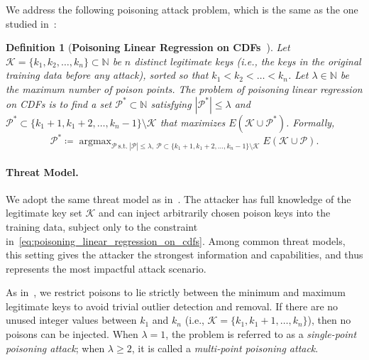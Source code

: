 \documentclass[acmsmall]{acmart}
\newtheorem{definition}{Definition}
\DeclareMathOperator*{\argmax}{argmax}
\begin{document}
We address the following poisoning attack problem, which is the same as the one studied in~\cite{kornaropoulos2022price}:
\begin{definition_box}
\begin{definition}[\textbf{Poisoning Linear Regression on CDFs~\cite[Def. 2]{kornaropoulos2022price}}]
\label{def:poisoning_linear_regression_on_cdfs}
Let $\mathcal{K} = \{k_1, k_2, \dots, k_n\} \subset \mathbb{N}$ be $n$ distinct legitimate keys (i.e., the keys in the original training data before any attack), sorted so that $k_1 < k_2 < \dots < k_n$.
Let $\lambda \in \mathbb{N}$ be the maximum number of poison points.
The problem of poisoning linear regression on CDFs is to find a set $\mathcal{P}^\ast \subset \mathbb{N}$ satisfying $|\mathcal{P}^\ast| \leq \lambda$ and $\mathcal{P}^\ast \subset \{k_1 + 1, k_1 + 2, \dots, k_n - 1\} \setminus \mathcal{K}$ that maximizes $E(\mathcal{K} \cup \mathcal{P}^\ast)$.
Formally, 
\begin{equation}
\label{eq:poisoning_linear_regression_on_cdfs}
    \mathcal{P}^\ast \coloneq \argmax_{\mathcal{P} ~ \mathrm{s.t.} ~ |\mathcal{P}| \leq \lambda, ~ \mathcal{P} \subset \{k_1 + 1, k_1 + 2, \dots, k_n - 1\} \setminus \mathcal{K}} E(\mathcal{K} \cup \mathcal{P}).
\end{equation}
\end{definition}
\end{definition_box}
\paragraph{Threat Model.}
We adopt the same threat model as in~\cite{kornaropoulos2022price}.
The attacker has full knowledge of the legitimate key set $\mathcal{K}$ and can inject arbitrarily chosen poison keys into the training data, subject only to the constraint in~\cref{eq:poisoning_linear_regression_on_cdfs}.
Among common threat models, this setting gives the attacker the strongest information and capabilities, and thus represents the most impactful attack scenario.

As in~\cite{kornaropoulos2022price}, we restrict poisons to lie strictly between the minimum and maximum legitimate keys to avoid trivial outlier detection and removal.
If there are no unused integer values between $k_1$ and $k_n$ (i.e., $\mathcal{K}=\{k_1,k_1+1,\dots,k_n\}$), then no poisons can be injected.
When $\lambda = 1$, the problem is referred to as a \textit{single-point poisoning attack}; when $\lambda \geq 2$, it is called a \textit{multi-point poisoning attack}.
\end{document}
